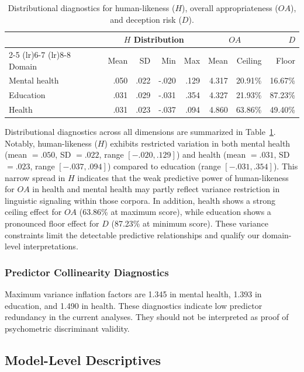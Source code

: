 \documentclass[manuscript,review,anonymous]{acmart}
\begin{document}
\begin{table}[t]
\centering
\small
\caption{Distributional diagnostics for human-likeness ($H$), overall appropriateness ($OA$), and deception risk ($D$).}
\label{tab:ceiling}
\begin{tabular}{lrrrrrrr}
\toprule
 & \multicolumn{4}{c}{$H$ Distribution} & \multicolumn{2}{c}{$OA$} & $D$ \\
\cmidrule(lr){2-5} \cmidrule(lr){6-7} \cmidrule(lr){8-8}
Domain & Mean & SD & Min & Max & Mean & Ceiling & Floor \\
\midrule
Mental health & .050 & .022 & -.020 & .129 & 4.317 & 20.91\% & 16.67\% \\
Education     & .031 & .029 & -.031 & .354 & 4.327 & 21.93\% & 87.23\% \\
Health        & .031 & .023 & -.037 & .094 & 4.860 & 63.86\% & 49.40\% \\
\bottomrule
\end{tabular}
\end{table}


Distributional diagnostics across all dimensions are summarized in Table~\ref{tab:ceiling}. Notably, human-likeness ($H$) exhibits restricted variation in both mental health (mean $= .050$, SD $= .022$, range $[-.020, .129]$) and health (mean $= .031$, SD $= .023$, range $[-.037, .094]$) compared to education (range $[-.031, .354]$). This narrow spread in $H$ indicates that the weak predictive power of human-likeness for $OA$ in health and mental health may partly reflect variance restriction in linguistic signaling within those corpora. In addition, health shows a strong ceiling effect for $OA$ (63.86\% at maximum score), while education shows a pronounced floor effect for $D$ (87.23\% at minimum score). These variance constraints limit the detectable predictive relationships and qualify our domain-level interpretations.

\subsubsection{Predictor Collinearity Diagnostics}

Maximum variance inflation factors are 1.345 in mental health, 1.393 in education, and 1.490 in health. These diagnostics indicate low predictor redundancy in the current analyses. They should not be interpreted as proof of psychometric discriminant validity.

\subsection{Model-Level Descriptives}
\end{document}
